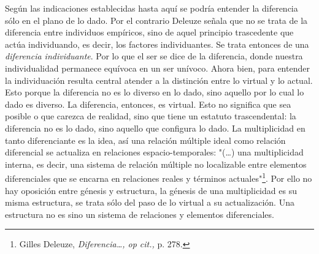 \documentclass{book}
\begin{document}
Según las indicaciones establecidas hasta aquí se podría entender la
diferencia sólo en el plano de lo dado. Por el contrario Deleuze señala
que no se trata de la diferencia entre individuos empíricos, sino de
aquel principio trascedente que actúa individuando, es decir, los
factores individuantes. Se trata entonces de una \emph{diferencia
individuante}. Por lo que el ser se dice de la diferencia, donde nuestra
individualidad permanece equívoca en un ser unívoco. Ahora bien, para
entender la individuación resulta central atender a la distinción entre
lo virtual y lo actual. Esto porque la diferencia no es lo diverso en lo
dado, sino aquello por lo cual lo dado es diverso. La diferencia,
entonces, es virtual. Esto no significa que sea posible o que carezca de
realidad, sino que tiene un estatuto trascendental: la diferencia no es
lo dado, sino aquello que configura lo dado. La multiplicidad en tanto
diferenciante es la idea, así una relación múltiple ideal como relación
diferencial se actualiza en relaciones espacio-temporales: "(\dots)
una multiplicidad interna, es decir, una sistema de relación múltiple no
localizable entre elementos diferenciales que se encarna en relaciones
reales y términos actuales"\footnote{Gilles Deleuze,
  \emph{Diferencia\ldots, op cit.,} p. 278.}. Por ello no hay oposición
entre génesis y estructura, la génesis de una multiplicidad es su misma
estructura, se trata sólo del paso de lo virtual a su actualización. Una
estructura no es sino un sistema de relaciones y elementos
diferenciales.
\end{document}
